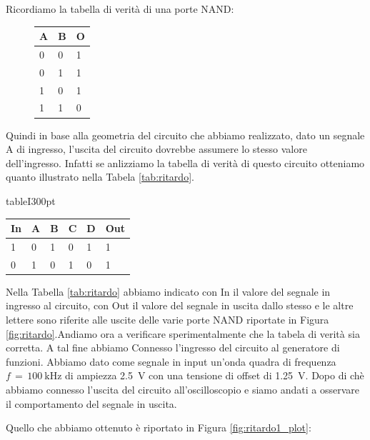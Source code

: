 Ricordiamo la tabella di verità di una porte NAND:

\begin{figure}[h]
\centering
	\begin{tabular}{lll}
	\toprule
		A & B & O\\
	\midrule
		0 & 0 & 1 \\
		0 & 1 & 1 \\
		1 & 0 & 1 \\
		1 & 1 & 0 \\
	\bottomrule
	\end{tabular}
\end{figure}
%
Quindi in base alla geometria del circuito che abbiamo realizzato, dato un segnale A di ingresso, l'uscita del circuito dovrebbe assumere lo stesso valore dell'ingresso. Infatti se anlizziamo la tabella di verità di questo circuito otteniamo quanto illustrato nella Tabela \ref{tab:ritardo}.

\begin{wrapfloat}{table}{I}{300pt}
\centering
	\begin{tabular}{l | llll | l}
	\toprule
		In & A & B & C & D & Out\\
	\midrule
		1 & 0 & 1 & 0 & 1 & 1 \\
		0 & 1 & 0 & 1 & 0 & 1 \\
	\bottomrule
	\end{tabular}
	\caption{Tabella di verità del circuito in Figura \ref{fig:ritardo}}
	\label{tab:ritardo}
\end{wrapfloat}

Nella Tabella \ref{tab:ritardo} abbiamo indicato con In il valore del segnale in ingresso al circuito, con Out il valore del segnale in uscita dallo stesso e le altre lettere sono riferite alle uscite delle varie porte NAND riportate in Figura \ref{fig:ritardo}.Andiamo ora a verificare sperimentalmente che la tabela di verità sia corretta. A tal fine abbiamo Connesso l'ingresso del circuito al generatore di funzioni. Abbiamo dato come segnale in input un'onda quadra di frequenza $f\,=\,\SI{100}{\kilo\hertz}$ di ampiezza \SI{2.5}{\volt} con una tensione di offset di \SI{1.25}{\volt}. Dopo di chè abbiamo connesso l'uscita del circuito all'oscilloscopio e siamo andati a osservare il comportamento del segnale in uscita.

Quello che abbiamo ottenuto è riportato in Figura \ref{fig:ritardo1_plot}:

